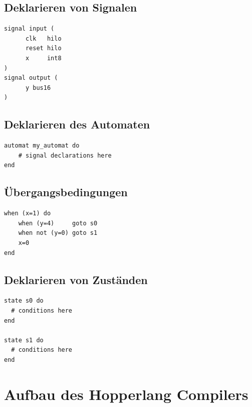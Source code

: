 \documentclass{htw}
\begin{document}
\subsection{Deklarieren von Signalen}

\begin{listing}[H]
\begin{verbatim}
signal input (
      clk   hilo
      reset hilo
      x     int8
)
signal output (
      y bus16
)
\end{verbatim}
\label{lst:hl_signals}
\end{listing}

\subsection{Deklarieren des Automaten}

\begin{listing}[H]
\begin{verbatim}
automat my_automat do
    # signal declarations here
end
\end{verbatim}
\label{lst:hl_autom}
\end{listing}

\subsection{Übergangsbedingungen}

\begin{listing}[H]
\begin{verbatim}
when (x=1) do
    when (y=4)     goto s0
    when not (y=0) goto s1
    x=0
end
\end{verbatim}
\label{lst:hl_when}
\end{listing}

\subsection{Deklarieren von Zuständen}

\begin{listing}[H]
\begin{verbatim}
state s0 do
  # conditions here
end

state s1 do
  # conditions here
end
\end{verbatim}
\label{lst:hl_states}
\end{listing}

\newpage
\section{Aufbau des Hopperlang Compilers}
\end{document}
